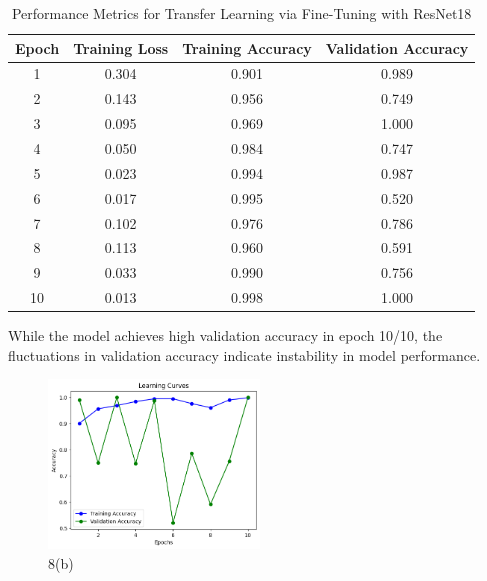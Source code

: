 \documentclass[a4paper,10 pt]{article}
\begin{document}
\begin{table}[H]
  \centering
  \caption{Performance Metrics for Transfer Learning via Fine-Tuning with ResNet18}
  \label{tab:resnet18_finetuning_performance}
  \begin{tabular}{@{}cccc@{}}
    \toprule
    \textbf{Epoch} & \textbf{Training Loss} & \textbf{Training Accuracy} & \textbf{Validation Accuracy} \\
    \midrule
    1 & 0.304 & 0.901 & 0.989 \\
    2 & 0.143 & 0.956 & 0.749 \\
    3 & 0.095 & 0.969 & 1.000 \\
    4 & 0.050 & 0.984 & 0.747 \\
    5 & 0.023 & 0.994 & 0.987 \\
    6 & 0.017 & 0.995 & 0.520 \\
    7 & 0.102 & 0.976 & 0.786 \\
    8 & 0.113 & 0.960 & 0.591 \\
    9 & 0.033 & 0.990 & 0.756 \\
    10 & 0.013 & 0.998 & 1.000 \\
    \bottomrule
\end{tabular}
\end{table}

  \vspace{12pt}

  While the model achieves high validation accuracy in epoch 10/10, the fluctuations in validation accuracy indicate instability in model performance. 

  \begin{figure}[H]
    \centering
    \includegraphics[width=0.5\textwidth]{graphQ8r.png} %
    \caption{8(b)}
  \end{figure}
\end{document}
